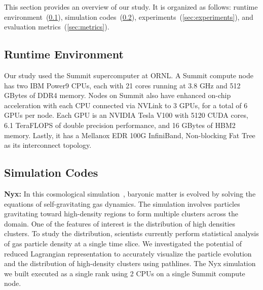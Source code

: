 This section provides an overview of our study. It is organized as follows: runtime environment~(\ref{sec:runtime}), simulation codes~(\ref{sec:simulations}), experiments~(\ref{sec:experiments}), and evaluation metrics~(\ref{sec:metrics}). %

\vspace{-1mm}
\subsection{Runtime Environment}
\label{sec:runtime}
Our study used the Summit supercomputer at ORNL.
%
A Summit compute node has two IBM Power9 CPUs, each with 21 cores running at 3.8 GHz and 512 GBytes of DDR4 memory.
%
Nodes on Summit also have enhanced on-chip acceleration with each CPU connected via NVLink to 3 GPUs, for a total of 6 GPUs per node.
%
Each GPU is an NVIDIA Tesla V100 with 5120 CUDA cores, 6.1 TeraFLOPS of double precision performance, and 16 GBytes of HBM2 memory.
%
Lastly, it has a Mellanox EDR 100G InfiniBand, Non-blocking Fat Tree as its interconnect topology.

\vspace{-1mm}
\subsection{Simulation Codes}
\label{sec:simulations}
%
%

\textbf{Nyx:} In this cosmological simulation~\cite{almgren2013nyx}, baryonic matter is evolved by solving the equations of self-gravitating gas dynamics.
%
The simulation involves particles gravitating toward high-density regions to form multiple clusters across the domain. 
%
%
One of the features of interest is the distribution of high densities clusters.
%
To study the distribution, scientists currently perform statistical analysis of gas particle density at a single time slice.
%
We investigated the potential of reduced Lagrangian representation to accurately visualize the particle evolution and the distribution of high-density clusters using pathlines.
%
The Nyx simulation we built executed as a single rank using 2 CPUs on a single Summit compute node.
%


